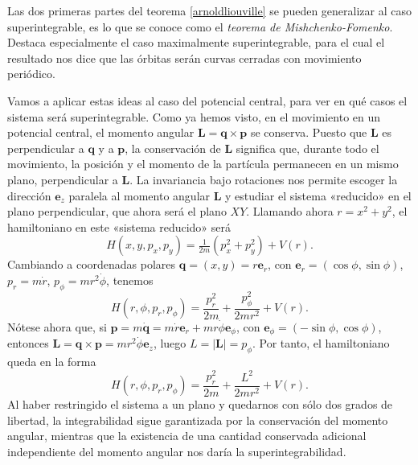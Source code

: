 \documentclass[12pt,a4paper,twoside]{article}
\theoremstyle{definition} \newtheorem{defn}[thm]{Definición}
\theoremstyle{definition} \newtheorem{ejemplo}[thm]{Ejemplo}
\theoremstyle{definition} \newtheorem{ejercicio}[thm]{Ejercicio}
\theoremstyle{remark} \newtheorem*{obs}{Observación}
\newcommand{\vect}[1]{\mathbf{#1}}
\begin{document}
  Las dos primeras partes del teorema \ref{arnoldliouville} se pueden generalizar al caso superintegrable, es lo que se conoce como el \emph{teorema de Mishchenko-Fomenko}. Destaca especialmente el caso maximalmente superintegrable, para el cual el resultado nos dice que las órbitas serán curvas cerradas con movimiento periódico.

  Vamos a aplicar estas ideas al caso del potencial central, para ver en qué casos el sistema será superintegrable. Como ya hemos visto, en el movimiento en un potencial central, el momento angular $\vect{L}=\vect{q}\times \vect{p}$ se conserva. Puesto que $\vect{L}$ es perpendicular a $\vect{q}$ y a $\vect{p}$, la conservación de $\vect{L}$ significa que, durante todo el movimiento, la posición y el momento de la partícula permanecen en un mismo plano, perpendicular a $\vect{L}$. La invariancia bajo rotaciones nos permite escoger la dirección $\vect{e}_z$ paralela al momento angular $\vect{L}$ y estudiar el sistema «reducido» en el plano perpendicular, que ahora será el plano $XY$. Llamando ahora $r=x^2+y^2$, el hamiltoniano en este «sistema reducido» será
  \begin{equation}
    H(x,y,p_x,p_y)= \tfrac{1}{2m}(p_x^2+p_y^2)+V(r).
  \end{equation}
  Cambiando a coordenadas polares $\vect{q}=(x,y)=r\vect{e}_{r}$, con $\vect{e}_r=(\cos \phi, \sin \phi)$, $p_r=m\dot r$, $p_{\phi}=mr^2\dot \phi$, tenemos
  \begin{equation}
    H(r,\phi,p_r,p_{\phi})=\frac{p_r^2}{2m}+\frac{p_{\phi}^2}{2mr^2}+V(r). 
  \end{equation}
  Nótese ahora que, si $\vect{p}=m\dot{\vect{q}}=m\dot r \vect{e}_r + mr \dot \phi \vect{e}_{\phi}$, con $\vect{e}_{\phi}=(-\sin \phi,\cos \phi)$, entonces $\vect{L}=\vect{q}\times \vect{p}=mr^2\dot \phi \vect{e}_z$, luego $L=|\vect{L}|=p_{\phi}$. Por tanto, el hamiltoniano queda en la forma
  \begin{equation}
    H(r,\phi,p_r,p_{\phi})=\frac{p_r^2}{2m}+\frac{L^2}{2mr^2}+V(r). 
  \end{equation}
  Al haber restringido el sistema a un plano y quedarnos con sólo dos grados de libertad, la integrabilidad sigue garantizada por la conservación del momento angular, mientras que la existencia de una cantidad conservada adicional independiente del momento angular nos daría la superintegrabilidad.
\end{document}
